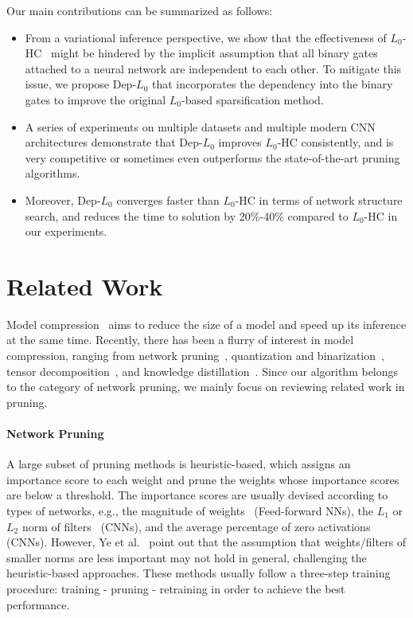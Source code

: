 \documentclass[runningheads, envcountsame, a4paper]{llncs}
\begin{document}
Our main contributions can be summarized as follows:
\begin{itemize}
\item From a variational inference perspective, we show that the effectiveness of $L_0$-HC~\cite{louizos2017learning} might be hindered by the implicit assumption that all binary gates attached to a neural network are independent to each other. To mitigate this issue, we propose Dep-$L_0$ that incorporates the dependency into the binary gates to improve the original $L_0$-based sparsification method.

\item A series of experiments on multiple datasets and multiple modern CNN architectures demonstrate that Dep-$L_0$ improves $L_0$-HC consistently, and is very competitive or sometimes even outperforms the state-of-the-art pruning algorithms.

\item Moreover, Dep-$L_0$ converges faster than $L_0$-HC in terms of network structure search, and reduces the time to solution by 20\%-40\% compared to $L_0$-HC in our experiments. 
\end{itemize}

\section{Related Work}

Model compression~\cite{model_compression} aims to reduce the size of a model and speed up its inference at the same time. Recently, there has been a flurry of interest in model compression, ranging from network pruning~\cite{lecun1990optimal,han2015learning,louizos2017learning,li2019l_0,lin2019toward}, quantization and binarization~\cite{courbariaux2016binarized,gupta2015deep}, tensor decomposition~\cite{jaderberg2014speeding,denton2014exploiting}, and knowledge distillation~\cite{hinton2015distilling}. Since our algorithm belongs to the category of network pruning, we mainly focus on reviewing related work in pruning.

\paragraph{\textbf{Network Pruning}}
A large subset of pruning methods is heuristic-based, which assigns an importance score to each weight and prune the weights whose importance scores are below a threshold. The importance scores are usually devised according to types of networks, e.g., the magnitude of weights~\cite{lecun1990optimal,han2015learning} (Feed-forward NNs), the $L_1$ or $L_2$ norm of filters~\cite{li2016pruning} (CNNs), and the average percentage of zero activations~\cite{hu2016network} (CNNs). However, Ye et al.~\cite{ye2018rethinking} point out that the assumption that weights/filters of smaller norms are less important may not hold in general, challenging the heuristic-based approaches. These methods usually follow a three-step training procedure: training - pruning - retraining in order to achieve the best performance.
\end{document}
